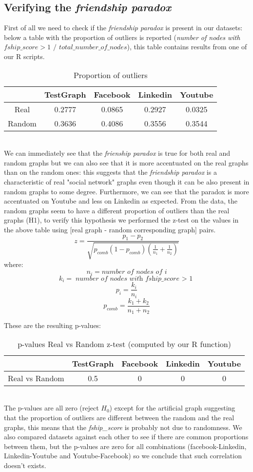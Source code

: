 \documentclass{article}
\begin{document}
\subsection{Verifying the \textit{friendship paradox}}
First of all we need to check if the \textit{friendship paradox} is present in our datasets: below a table with the proportion of outliers is reported (\textit{number of nodes with $fship\_score > 1$ $/$ $total\_number\_of\_nodes$}), this table contains results from one of our R scripts. 
\begin{table}[ht]
\centering
\begin{tabular}{|c|c|c|c|c|}
\hline
& TestGraph & Facebook & Linkedin & Youtube \\ \hline
Real & 0.2777 & 0.0865 & 0.2927 & 0.0325\\ \hline
Random & 0.3636 & 0.4086 & 0.3556 & 0.3544 \\ \hline
\end{tabular}
\caption{Proportion of outliers}
\end{table} 
\\

We can immediately see that the \textit{frienship paradox} is true for both real and random graphs but we can also see that it is more accentuated on the real graphs than on the random ones: this suggests that the \textit{friendship paradox} is a characteristic of real "social network" graphs even though it can be also present in random graphs to some degree. Furthermore, we can see that the paradox is more accentuated on Youtube and less on Linkedin as expected. From the data, the random graphs seem to have a different proportion of outliers than the real graphs (H1), to verify this hypothesis we performed the z-test on the values in the above table using [real graph - random corresponding graph] pairs.
\[z = \frac{p_1 - p_2}{\sqrt{p_{comb} (1 - p_{comb}) \left( \frac{1}{n_1} + \frac{1}{n_2} \right)}}\]
where:
\[n_i = \textit{number of nodes of i}\]
\[k_i = \textit{number of nodes with fship\_score $>$ 1}\]
\[p_i = \frac{k_i}{n_i}\]
\[p_{comb} = \frac{k_1 + k_2}{n_1 + n_2}\]


These are the resulting p-values: \\
\begin{table}[ht]
\centering
\begin{tabular}{|c|c|c|c|c|}
\hline
& TestGraph & Facebook & Linkedin & Youtube \\ \hline
Real vs Random & 0.5 & 0 & 0 & 0\\ \hline
\end{tabular}
\caption{p-values Real vs Random z-test (computed by our R function)}
\end{table} 
\\
The p-values are all zero (reject \(H_0\)) except for the artificial graph suggesting that the proportion of outliers are different between the random and the real graphs, this means that the \textit{fship\_score} is probably not due to randomness. We also compared datasets against each other to see if there are common proportions between them, but the p-values are zero for all combinations (facebook-Linkedin, Linkedin-Youtube and Youtube-Facebook) so we conclude that such correlation doesn't exists.
\end{document}
